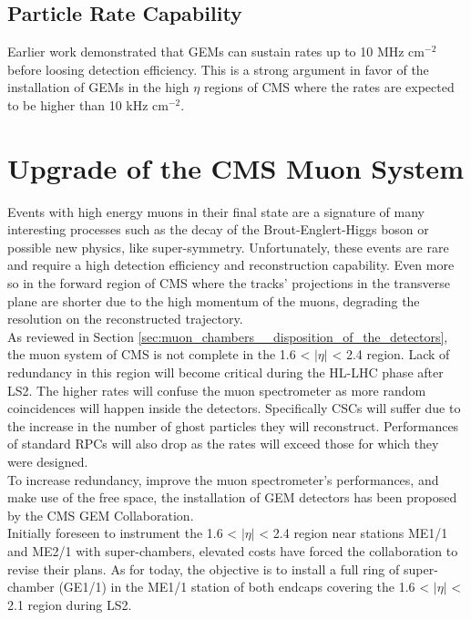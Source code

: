         \subsection{Particle Rate Capability}

            Earlier work \Cite{GEM_Rates} demonstrated that GEMs can sustain rates up to 10 MHz cm$ ^{-2} $ before loosing detection efficiency. This is a strong argument in favor of the installation of GEMs in the high $ \eta $ regions of CMS where the rates are expected to be higher than 10 kHz cm$ ^{-2} $.   

    \section{Upgrade of the CMS Muon System}

        Events with high energy muons in their final state are a signature of many interesting processes such as the decay of the Brout-Englert-Higgs boson or possible new physics, like super-symmetry. Unfortunately, these events are rare and require a high detection efficiency and reconstruction capability. Even more so in the forward region of CMS where the tracks' projections in the transverse plane are shorter due to the high momentum of the muons, degrading the resolution on the reconstructed trajectory. \\

        As reviewed in Section \ref{sec:muon_chambers__disposition_of_the_detectors}, the muon system of CMS is not complete in the 1.6 < $ | \eta | $ < 2.4 region. Lack of redundancy in this region will become critical during the HL-LHC phase after LS2. The higher rates will confuse the muon spectrometer as more random coincidences will happen inside the detectors. Specifically CSCs will suffer due to the increase in the number of ghost particles they will reconstruct. Performances of standard RPCs will also drop as the rates will exceed those for which they were designed. \\

        To increase redundancy, improve the muon spectrometer's performances, and make use of the free space, the installation of GEM detectors has been proposed by the CMS GEM Collaboration. \\

        Initially foreseen to instrument the 1.6 < $ | \eta | $ < 2.4 region near stations ME1/1 and ME2/1 with super-chambers, elevated costs have forced the collaboration to revise their plans. As for today, the objective is to install a full ring of super-chamber (GE1/1) in the ME1/1 station of both endcaps covering the 1.6 < $ | \eta | $ < 2.1 region during LS2. \\

